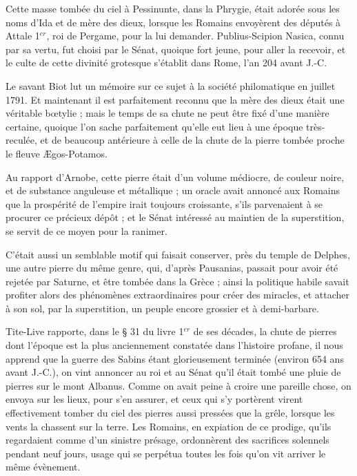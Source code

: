\documentclass[a4paper, 12pt, oneside, french]{article}
\begin{document}
Cette masse tombée du ciel à Pessinunte, dans la Phrygie, était adorée sous les noms d'Ida et de mère des dieux, lorsque les Romains envoyèrent des députés à Attale 1$^{er}$, roi de Pergame, pour la lui demander. Publius-Scipion Nasica, connu par sa vertu, fut choisi par le Sénat, quoique fort jeune, pour aller la recevoir, et le culte de cette divinité grotesque s'établit dans Rome, l'an 204 avant J.-C.

Le savant Biot lut un mémoire sur ce sujet à la société philomatique en juillet 1791. Et maintenant il est parfaitement reconnu que la mère des dieux était une véritable bœtylie ; mais le temps de sa chute ne peut être fixé d'une manière certaine, quoique l'on sache parfaitement qu'elle eut lieu à une époque très-reculée, et de beaucoup antérieure à celle de la chute de la pierre tombée proche le fleuve Ægos-Potamos.

Au rapport d'Arnobe, cette pierre était d'un volume médiocre, de couleur noire, et de substance anguleuse et métallique ; un oracle avait annoncé aux Romains que la prospérité de l'empire irait toujours croissante, s'ils parvenaient à se procurer ce précieux dépôt ; et le Sénat intéressé au maintien de la superstition, se servit de ce moyen pour la ranimer.

C'était aussi un semblable motif qui faisait conserver, près du temple de Delphes, une autre pierre du même genre, qui, d'après Pausanias, passait pour avoir été rejetée par Saturne, et être tombée dans la Grèce ; ainsi la politique habile savait profiter alors des phénomènes extraordinaires pour créer des miracles, et attacher à son sol, par la superstition, un peuple encore grossier et à demi-barbare.

Tite-Live rapporte, dans le § 31 du livre 1$^{er}$ de ses décades, la chute de pierres dont l'époque est la plus anciennement constatée dans l'histoire profane, il nous apprend que la guerre des Sabins étant glorieusement terminée (environ 654 ans avant J.-C.), on vint annoncer au roi et au Sénat qu'il était tombé une pluie de pierres sur le mont Albanus. Comme on avait peine à croire une pareille chose, on envoya sur les lieux, pour s'en assurer, et ceux qui s'y portèrent virent effectivement tomber du ciel des pierres aussi pressées que la grêle, lorsque les vents la chassent sur la terre. Les Romains, en expiation de ce prodige, qu'ils regardaient comme d'un sinistre présage, ordonnèrent des sacrifices solennels pendant neuf jours, usage qui se perpétua toutes les fois qu'on vit arriver le même évènement.
\end{document}
